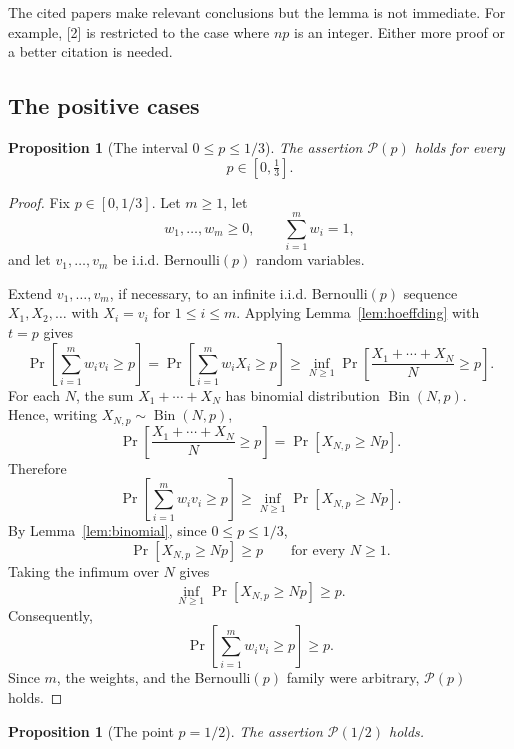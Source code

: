 \documentclass[12pt]{article}
\theoremstyle{definition}
\theoremstyle{plain}
\newtheorem{proposition}[definition]{Proposition}
\theoremstyle{remark}
\newcommand{\review}[1]{\begin{reviewbox}#1\end{reviewbox}}
\begin{document}
\review{The cited papers make relevant conclusions but the lemma is not immediate. For example, [2] is restricted to the case where $np$ is an integer. Either more proof or a better citation is needed.}

\subsection{The positive cases}

\begin{proposition}[The interval \(0\le p\le1/3\)]\label{prop:smallp}
The assertion \(\mathcal P(p)\) holds for every
\[
p\in[0,\tfrac13].
\]
\end{proposition}

\begin{proof}
Fix \(p\in[0,1/3]\). Let \(m\ge1\), let
\[
w_1,\ldots,w_m\ge0,\qquad \sum_{i=1}^{m}w_i=1,
\]
and let \(v_1,\ldots,v_m\) be i.i.d. Bernoulli\((p)\) random variables.

Extend \(v_1,\ldots,v_m\), if necessary, to an infinite i.i.d. Bernoulli\((p)\) sequence \(X_1,X_2,\ldots\) with \(X_i=v_i\) for \(1\le i\le m\). Applying Lemma~\ref{lem:hoeffding} with \(t=p\) gives
\[
\Pr\!\left[\sum_{i=1}^{m}w_i v_i\ge p\right]
=
\Pr\!\left[\sum_{i=1}^{m}w_i X_i\ge p\right]
\ge
\inf_{N\ge1}
\Pr\!\left[\frac{X_1+\cdots+X_N}{N}\ge p\right].
\]
For each \(N\), the sum \(X_1+\cdots+X_N\) has binomial distribution \(\operatorname{Bin}(N,p)\). Hence, writing \(X_{N,p}\sim\operatorname{Bin}(N,p)\),
\[
\Pr\!\left[\frac{X_1+\cdots+X_N}{N}\ge p\right]
=
\Pr[X_{N,p}\ge Np].
\]
Therefore
\[
\Pr\!\left[\sum_{i=1}^{m}w_i v_i\ge p\right]
\ge
\inf_{N\ge1}\Pr[X_{N,p}\ge Np].
\]
By Lemma~\ref{lem:binomial}, since \(0\le p\le1/3\),
\[
\Pr[X_{N,p}\ge Np]\ge p
\qquad\text{for every }N\ge1.
\]
Taking the infimum over \(N\) gives
\[
\inf_{N\ge1}\Pr[X_{N,p}\ge Np]\ge p.
\]
Consequently,
\[
\Pr\!\left[\sum_{i=1}^{m}w_i v_i\ge p\right]\ge p.
\]
Since \(m\), the weights, and the Bernoulli\((p)\) family were arbitrary, \(\mathcal P(p)\) holds.
\end{proof}

\begin{proposition}[The point \(p=1/2\)]\label{prop:halfp}
The assertion \(\mathcal P(1/2)\) holds.
\end{proposition}
\end{document}
